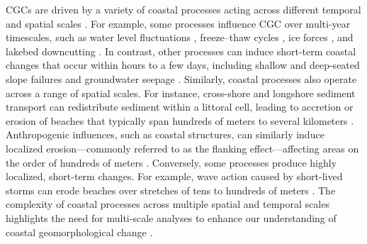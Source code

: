 CGCs are driven by a variety of coastal processes acting across different
temporal and spatial scales \citep{lollino2021multi}. For example, some
processes influence CGC over multi-year timescales, such as water level
fluctuations
\citep{meadows_relationship_1997,brown_factors_2005,swenson_bluff_2006},
freeze–thaw cycles
\citep{vallejo1981stability,bernatchez2011development,roland2021seasonality},
ice forces \citep{barnes1994influence,bamasoud2012impact}, and lakebed
downcutting \citep{davidson2000effects,fuller2002bank}. In contrast, other
processes can induce short-term coastal changes that occur within hours to a few
days, including shallow and deep-seated slope failures
\citep{edil_mechanics_1980,quinn2010identifying} and groundwater seepage
\citep{collins_processes_2008,brooks2012deriving}. Similarly, coastal processes
also operate across a range of spatial scales. For instance, cross-shore and
longshore sediment transport can redistribute sediment within a littoral cell,
leading to accretion or erosion of beaches that typically span hundreds of
meters to several kilometers \citep{harley2011reevaluation}. Anthropogenic
influences, such as coastal structures, can similarly induce localized
erosion—commonly referred to as the flanking effect—affecting areas on the order
of hundreds of meters \citep{lin_field_2014}.  Conversely, some processes
produce highly localized, short-term changes. For example, wave action caused by
short-lived storms can erode beaches over stretches of tens to hundreds of
meters \citep{ruggiero_wave_2001,swenson_bluff_2006}. The complexity of coastal
processes across multiple spatial and temporal scales highlights the need for
multi-scale analyses to enhance our understanding of coastal geomorphological
change \citep{ells2012long}.

